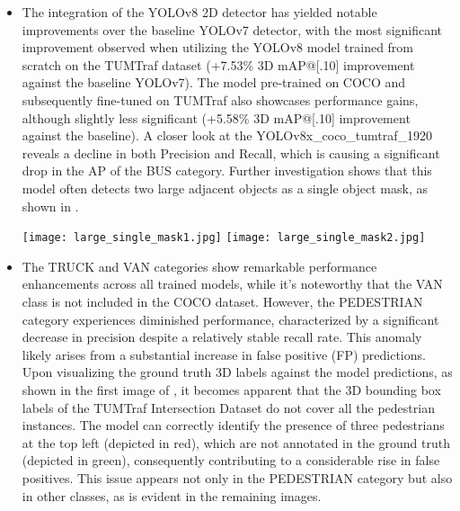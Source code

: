 \begin{itemize}
	\item The integration of the YOLOv8 2D detector has yielded notable improvements over the baseline YOLOv7 detector, with the most significant improvement observed when utilizing the YOLOv8 model trained from scratch on the TUMTraf dataset (+7.53\% 3D mAP@[.10] improvement against the baseline YOLOv7). The model pre-trained on COCO and subsequently fine-tuned on TUMTraf also showcases performance gains, although slightly less significant (+5.58\% 3D mAP@[.10] improvement against the baseline). A closer look at the YOLOv8x\_coco\_tumtraf\_1920 reveals a decline in both Precision and Recall, which is causing a significant drop in the AP of the BUS category. Further investigation shows that this model often detects two large adjacent objects as a single object mask, as shown in .
	
	\begin{minipage}{\linewidth}
		\centering
		\texttt{[image: large\_single\_mask1.jpg]}
		\texttt{[image: large\_single\_mask2.jpg]}
		\label{fig:single_mask}
	\end{minipage}
	
	\item The TRUCK and VAN categories show remarkable performance enhancements across all trained models, while it's noteworthy that the VAN class is not included in the COCO dataset. However, the PEDESTRIAN category experiences diminished performance, characterized by a significant decrease in precision despite a relatively stable recall rate. This anomaly likely arises from a substantial increase in false positive (FP) predictions. Upon visualizing the ground truth 3D labels against the model predictions, as shown in the first image of , it becomes apparent that the 3D bounding box labels of the TUMTraf Intersection Dataset do not cover all the pedestrian instances. The model can correctly identify the presence of three pedestrians at the top left (depicted in red), which are not annotated in the ground truth (depicted in green), consequently contributing to a considerable rise in false positives. This issue appears not only in the PEDESTRIAN category but also in other classes, as is evident in the remaining images.
	

\end{itemize}
